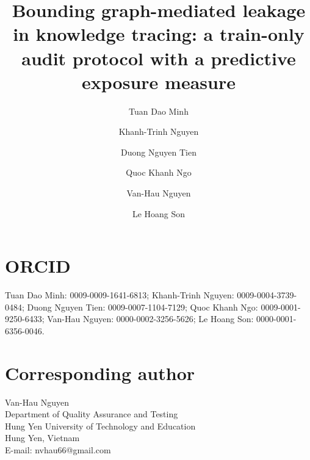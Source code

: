 \documentclass[preprint,12pt]{elsarticle}
\begin{document}
\begin{frontmatter}
\title{Bounding graph-mediated leakage in knowledge tracing: a train-only
audit protocol with a predictive exposure measure}

\author[utehy]{Tuan Dao Minh}

\author[utehy]{Khanh-Trinh Nguyen}

\author[utehy]{Duong Nguyen Tien}

\author[airca]{Quoc Khanh Ngo}

\author[utehy]{Van-Hau Nguyen}

\author[iti]{Le Hoang Son}



\end{frontmatter}

\section*{ORCID}
Tuan Dao Minh: 0009-0009-1641-6813;
Khanh-Trinh Nguyen: 0009-0004-3739-0484;
Duong Nguyen Tien: 0009-0007-1104-7129;
Quoc Khanh Ngo: 0009-0001-9250-6433;
Van-Hau Nguyen: 0000-0002-3256-5626;
Le Hoang Son: 0000-0001-6356-0046.

\section*{Corresponding author}
Van-Hau Nguyen\\
Department of Quality Assurance and Testing\\
Hung Yen University of Technology and Education\\
Hung Yen, Vietnam\\
E-mail: nvhau66@gmail.com
\end{document}
